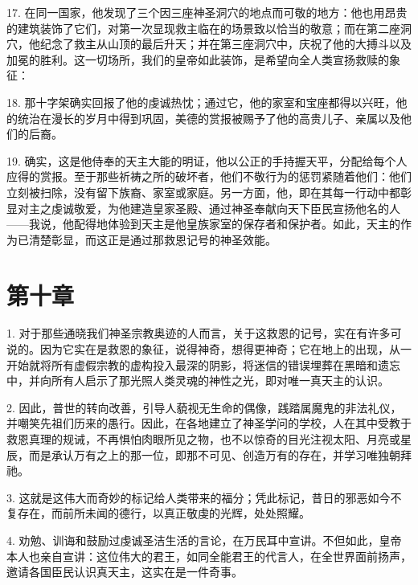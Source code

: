 17. 在同一国家，他发现了三个因三座神圣洞穴的地点而可敬的地方：他也用昂贵的建筑装饰了它们，对第一次显现救主临在的场景致以恰当的敬意；而在第二座洞穴，他纪念了救主从山顶的最后升天；并在第三座洞穴中，庆祝了他的大搏斗以及加冕的胜利。这一切场所，我们的皇帝如此装饰，是希望向全人类宣扬救赎的象征：\par

18. 那十字架确实回报了他的虔诚热忱；通过它，他的家室和宝座都得以兴旺，他的统治在漫长的岁月中得到巩固，美德的赏报被赐予了他的高贵儿子、亲属以及他们的后裔。\par

19. 确实，这是他侍奉的天主大能的明证，他以公正的手持握天平，分配给每个人应得的赏报。至于那些祈祷之所的破坏者，他们不敬行为的惩罚紧随着他们：他们立刻被扫除，没有留下族裔、家室或家庭。另一方面，他，即在其每一行动中都彰显对主之虔诚敬爱，为他建造皇家圣殿、通过神圣奉献向天下臣民宣扬他名的人——我说，他配得地体验到天主是他皇族家室的保存者和保护者。如此，天主的作为已清楚彰显，而这正是通过那救恩记号的神圣效能。\par


\section{第十章}

1. 对于那些通晓我们神圣宗教奥迹的人而言，关于这救恩的记号，实在有许多可说的。因为它实在是救恩的象征，说得神奇，想得更神奇；它在地上的出现，从一开始就将所有虚假宗教的虚构投入最深的阴影，将迷信的错误埋葬在黑暗和遗忘中，并向所有人启示了那光照人类灵魂的神性之光，即对唯一真天主的认识。\par

2. 因此，普世的转向改善，引导人藐视无生命的偶像，践踏属魔鬼的非法礼仪，并嘲笑先祖们历来的愚行。因此，在各地建立了神圣学问的学校，人在其中受教于救恩真理的规诫，不再惧怕肉眼所见之物，也不以惊奇的目光注视太阳、月亮或星辰，而是承认万有之上的那一位，即那不可见、创造万有的存在，并学习唯独朝拜祂。\par

3. 这就是这伟大而奇妙的标记给人类带来的福分；凭此标记，昔日的邪恶如今不复存在，而前所未闻的德行，以真正敬虔的光辉，处处照耀。\par

4. 劝勉、训诲和鼓励过虔诚圣洁生活的言论，在万民耳中宣讲。不但如此，皇帝本人也亲自宣讲：这位伟大的君王，如同全能君王的代言人，在全世界面前扬声，邀请各国臣民认识真天主，这实在是一件奇事。\par

